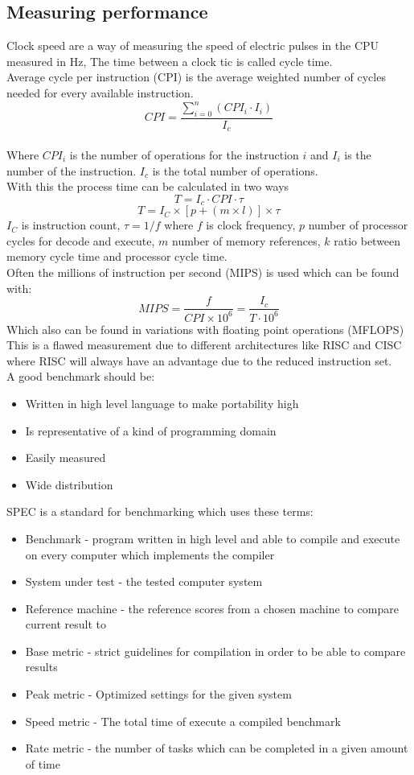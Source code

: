 \documentclass[12pt, a4paper]{article}
\begin{document}
		\subsection{Measuring performance}
			Clock speed are a way of measuring the speed of electric pulses in the CPU measured in Hz, The time between a clock tic is called cycle time.\\
			Average cycle per instruction (CPI) is the average weighted number of cycles needed for every available instruction. 
			$$CPI=\frac{\sum\limits_{i=0}^n(CPI_i\cdot I_i)}{I_c}$$\\
			Where $CPI_i$ is the number of operations for the instruction $i$ and $I_i$ is the number of the instruction. $I_c$ is the total number of operations.\\
			With this the process time can be calculated in two ways
			$$T=I_c\cdot CPI \cdot \tau$$
			$$T=I_C \times [p+(m\times l)]\times \tau$$
			$I_C$ is instruction count, $\tau=1/f$ where $f$ is clock frequency,  $p$ number of processor cycles for decode and execute, $m$ number of memory references, $k$ ratio between memory cycle time and processor cycle time.\\
			Often the millions of instruction per second (MIPS) is used which can be found with:
			$$MIPS = \frac{f}{CPI\times 10^6}=\frac{I_c}{T\cdot 10^6}$$
			Which also can be found in variations with floating point operations (MFLOPS)\\
			This is a flawed measurement due to different architectures like RISC and CISC where RISC will always have an advantage due to the reduced instruction set.\\[4mm]
			A good benchmark should be:
			\begin{itemize}
				\item Written in high level language to make portability high
				\item Is representative of a kind of programming domain
				\item Easily measured
				\item Wide distribution
			\end{itemize}
			SPEC is a standard for benchmarking which uses these terms:
			\begin{itemize}
				\item Benchmark - program written in high level and able to compile and execute on every computer which implements the compiler
				\item System under test - the tested computer system
				\item Reference machine - the reference scores from a chosen machine to compare current result to
				\item Base metric - strict guidelines for compilation in order to be able to compare results
				\item Peak metric - Optimized settings for the given system
				\item Speed metric - The total time of execute a compiled benchmark
				\item Rate metric - the number of tasks which can be completed in a given amount of time
			\end{itemize}
\end{document}
